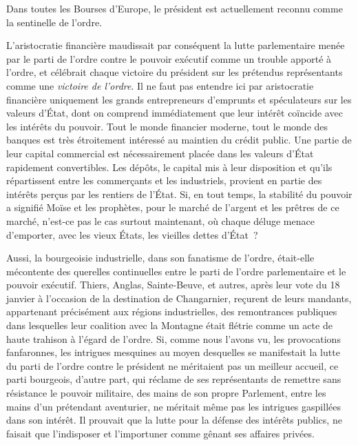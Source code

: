 \documentclass[french,twoside]{book} %
\newenvironment{quoteblock}%
  {\begin{quoting}}
  {\end{quoting}}
\newenvironment{quotebar}{%
    \def\FrameCommand{{\color{rubric!10!}\vrule width 0.5em} \hspace{0.9em}}%
    \def\OuterFrameSep{\itemsep} %
    \MakeFramed {\advance\hsize-\width \FrameRestore}
  }%
  {%
    \endMakeFramed
  }
\renewenvironment{quoteblock}%
  {%
    \savenotes
    \setstretch{0.9}
    \normalfont
    \begin{quotebar}
  }
  {%
    \end{quotebar}
    \spewnotes
  }
\begin{document}
\begin{quoteblock}
 \noindent Dans toutes les Bourses d’Europe, le président est actuellement reconnu comme la sentinelle de l’ordre.
\end{quoteblock}

\noindent L’aristocratie financière maudissait par conséquent la lutte parlementaire menée par le parti de l’ordre contre le pouvoir exécutif comme un trouble apporté à l’ordre, et célébrait chaque victoire du président sur les prétendus représentants comme une \emph{victoire de l’ordre}. Il ne faut pas entendre ici par aristocratie financière uniquement les grands entrepreneurs d’emprunts et spéculateurs sur les valeurs d’État, dont on comprend immédiatement que leur intérêt coïncide avec les intérêts du pouvoir. Tout le monde financier moderne, tout le monde des banques est très étroitement intéressé au maintien du crédit public. Une partie de leur capital commercial est nécessairement placée dans les valeurs d’État rapidement convertibles. Les dépôts, le capital mis à leur disposition et qu’ils répartissent entre les commerçants et les industriels, provient en partie des intérêts perçus par les rentiers de l’État. Si, en tout temps, la stabilité du pouvoir a signifié Moïse et les prophètes, pour le marché de l’argent et les prêtres de ce marché, n’est-ce pas le cas surtout maintenant, où chaque déluge menace d’emporter, avec les vieux États, les vieilles dettes d’État ?\par
\bigbreak
\noindent Aussi, la bourgeoisie industrielle, dans son fanatisme de l’ordre, était-elle mécontente des querelles continuelles entre le parti de l’ordre parlementaire et le pouvoir exécutif. Thiers, Anglas, Sainte-Beuve, et autres, après leur vote du 18 janvier à l’occasion de la destination de Changarnier, reçurent de leurs mandants, appartenant précisément aux régions industrielles, des remontrances publiques dans lesquelles leur coalition avec la Montagne était flétrie comme un acte de haute trahison à l’égard de l’ordre. Si, comme nous l’avons vu, les provocations fanfaronnes, les intrigues mesquines au moyen desquelles se manifestait la lutte du parti de l’ordre contre le président ne méritaient pas un meilleur accueil, ce parti bourgeois, d’autre part, qui réclame de ses représentants de remettre sans résistance le pouvoir militaire, des mains de son propre Parlement, entre les mains d’un prétendant aventurier, ne méritait même pas les intrigues gaspillées dans son intérêt. Il prouvait que la lutte pour la défense des intérêts publics, ne faisait que l’indisposer et l’importuner comme gênant ses affaires privées.\par
\end{document}
